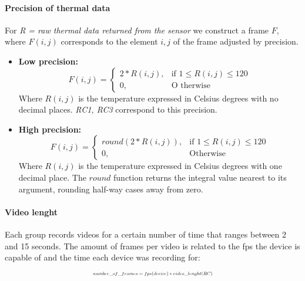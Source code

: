 \documentclass[oneside, twocolumn]{article}
\begin{document}
\paragraph{Precision of thermal data}
	For \textit{R = raw thermal data returned from the sensor} we construct a frame $F$, where $F(i,j)$ corresponds to the element $i,j$ of the frame adjusted by precision.

	\begin{itemize}
		\item \textbf{Low precision:}
			\[
			    F(i,j)=
			\begin{cases}
			    2 * R(i,j),		& \text{if } 1 \leq R(i,j) \leq 120\\
			    0,              & \text{O therwise}
			\end{cases}
			\]
			Where $R(i,j)$ is the temperature expressed in Celsius degrees with no decimal places. \textit{RC1, RC3} correspond to this precision.\\


		\item \textbf{High precision:}
			\[
			    F(i,j)=
			\begin{cases}
			    round(2 * R(i,j)),		& \text{if } 1 \leq R(i,j) \leq 120\\
			    0,              & \text{Otherwise}
			\end{cases}
			\]
			Where $R(i,j)$ is the temperature expressed in Celsius degrees with one decimal place. The $round$ function returns the integral value nearest to its argument, rounding half-way cases away from zero.
	\end{itemize}

\paragraph{Video lenght}
Each group records videos for a certain number of time that ranges between 2 and 15 seconds. The amount of frames per video is related to the fps the device is capable of and the time each device was recording for:
	\begin{equation}
	\resizebox{.423 \textwidth}{!}{$number\_of\_frames = fps(device) * video\_lenght(RC)$}
	\end{equation}
\end{document}
